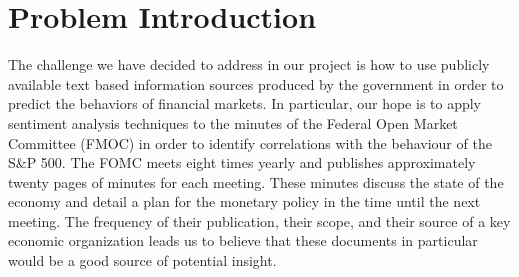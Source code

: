 \documentclass{sig-alternate-05-2015}
\begin{document}
%
\author{
%
%
\alignauthor
Aditya Bindra\\
       \\
       \\
\alignauthor
Paul Cherian\\
       \\
       \\
\alignauthor
Ben Haines\\
       \\
       \\
}
\date{30 July 1999}

\maketitle
\section{Problem Introduction}
The challenge we have decided to address in our project is
how to use publicly available text based information sources
produced by the government in order to predict the behaviors
of financial markets. In particular, our hope is to apply
sentiment analysis techniques to the minutes of the Federal
Open Market Committee (FMOC) in order to identify correlations with
the behaviour of the S\&P 500. The FOMC meets eight times yearly 
and publishes approximately twenty pages of minutes for each meeting.
These minutes discuss the state of the economy and detail a plan
for the monetary policy in the time until the next meeting. The 
frequency of their publication, their scope, and their source 
of a key economic organization leads us to believe that these
documents in particular would be a good source of potential 
insight.
\end{document}
